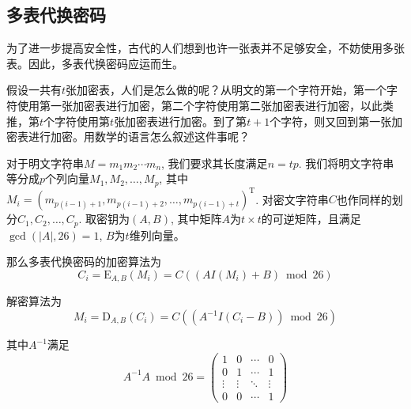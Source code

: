 \documentclass[UTF8]{ctexrep}
\def\abs#1{\left| #1 \right|}
\def\pth#1{\left( {#1}\right)}
\def\E#1#2{{\mathrm{E}_{#1}\left({#2}\right)}}
\def\D#1#2{{\mathrm{D}_{#1}\left({#2}\right)}}
\begin{document}
\subsection{多表代换密码}
为了进一步提高安全性，古代的人们想到也许一张表并不足够安全，不妨使用多张表。因此，多表代换密码应运而生。\par
假设一共有$t$张加密表，人们是怎么做的呢？从明文的第一个字符开始，第一个字符使用第一张加密表进行加密，第二个字符使用第二张加密表进行加密，以此类推，第$t$个字符使用第$t$张加密表进行加密。到了第$t+1$个字符，则又回到第一张加密表进行加密。用数学的语言怎么叙述这件事呢？\par
对于明文字符串$M=m_1m_2\cdots m_n$, 我们要求其长度满足$n=tp$. 我们将明文字符串等分成$p$个列向量$M_1, M_2, \ldots, M_p$, 其中$M_i=\pth{m_{p(i-1)+1}, m_{p(i-1)+2}, \ldots, m_{p(i-1)+t}}^{\mathrm{T}}$. 对密文字符串$C$也作同样的划分$C_1, C_2, \ldots, C_p$. 取密钥为$\pth{A, B}$, 其中矩阵$A$为$t\times t$的可逆矩阵，且满足$\gcd\pth{\abs{A}, 26}=1$, $B$为$t$维列向量。\par
那么多表代换密码的加密算法为
\begin{equation}
    C_i=\E{A, B}{M_i}=C\pth{\pth{AI\pth{M_i}+B}\bmod{26}}
\end{equation}

解密算法为
\begin{equation}
    M_i=\D{A, B}{C_i}=C\pth{\pth{A^{-1}I\pth{C_i-B}}\bmod{26}}
\end{equation}

其中$A^{-1}$满足
\[A^{-1}A\bmod{26}=\pth{\begin{array}{cccc}1&0&\cdots &0\\0&1&\cdots&1\\\vdots&\vdots&\ddots &\vdots\\0&0&\cdots&1\end{array}}\]
\end{document}
